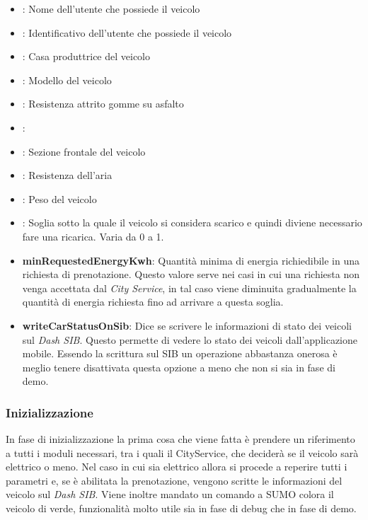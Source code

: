 \begin{itemize}
	\item {}: Nome dell'utente che possiede il veicolo
	\item {}: Identificativo dell'utente che possiede il veicolo
	\item {}: Casa produttrice del veicolo
	\item {}: Modello del veicolo
	\item {}: Resistenza attrito gomme su asfalto
	\item {}: 
	\item {}: Sezione frontale del veicolo
	\item {}: Resistenza dell'aria
	\item {}: Peso del veicolo
	\item {}: Soglia sotto la quale il veicolo si considera scarico e quindi diviene necessario fare una ricarica. Varia da 0 a 1.
	\item \textbf{minRequestedEnergyKwh}: Quantità minima di energia richiedibile in una richiesta di prenotazione. Questo valore serve nei casi in cui una richiesta non venga accettata dal \emph{City Service}, in tal caso viene diminuita gradualmente la quantità di energia richiesta fino ad arrivare a questa soglia.
	\item \textbf{writeCarStatusOnSib}: Dice se scrivere le informazioni di stato dei veicoli sul \emph{Dash SIB}. Questo permette di vedere lo stato dei veicoli dall'applicazione mobile. Essendo la scrittura sul SIB un operazione abbastanza onerosa è meglio tenere disattivata questa opzione a meno che non si sia in fase di demo.
\end{itemize}


\subsubsection{Inizializzazione}

In fase di inizializzazione la prima cosa che viene fatta è prendere un riferimento a tutti i moduli necessari, tra i quali il CityService, che  deciderà se il veicolo sarà elettrico o meno. Nel caso in cui sia elettrico allora si procede a reperire tutti i parametri e, se è abilitata la prenotazione, vengono scritte le informazioni del veicolo sul \emph{Dash SIB}. Viene inoltre mandato un comando a SUMO colora il veicolo di verde, funzionalità molto utile sia in fase di debug che in fase di demo.

